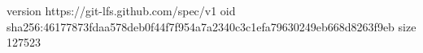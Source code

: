 version https://git-lfs.github.com/spec/v1
oid sha256:46177873fdaa578deb0f44f7f954a7a2340c3c1efa79630249eb668d8263f9eb
size 127523
